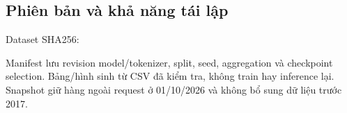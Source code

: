\documentclass[11pt,a4paper]{article}
\begin{document}
\subsection{Phiên bản và khả năng tái lập}
Dataset SHA256:
\begin{quote}\footnotesize\ttfamily
{}
\end{quote}
Manifest lưu revision model/tokenizer, split, seed, aggregation và
checkpoint selection. Bảng/hình sinh từ CSV đã kiểm tra, không train
hay inference lại. Snapshot giữ hàng ngoài request ở 01/10/2026 và
không bổ sung dữ liệu trước 2017.
\end{document}
